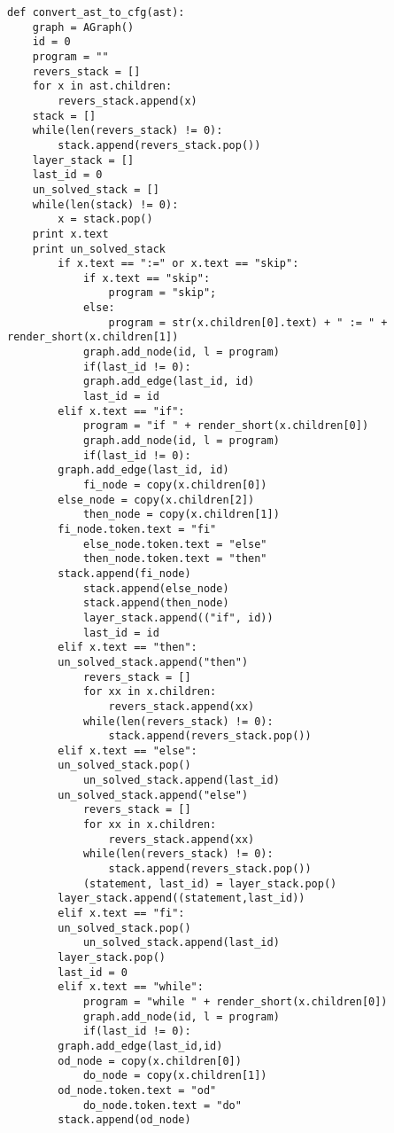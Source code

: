 \documentclass{article}
\begin{document}
{\begin{verbatim}
def convert_ast_to_cfg(ast):
    graph = AGraph()
    id = 0
    program = ""
    revers_stack = []
    for x in ast.children:
        revers_stack.append(x)
    stack = []
    while(len(revers_stack) != 0):
        stack.append(revers_stack.pop())
    layer_stack = []
    last_id = 0
    un_solved_stack = []
    while(len(stack) != 0):
        x = stack.pop()
	print x.text
	print un_solved_stack
        if x.text == ":=" or x.text == "skip":
            if x.text == "skip":
                program = "skip";
            else:
                program = str(x.children[0].text) + " := " + render_short(x.children[1])
            graph.add_node(id, l = program)
            if(last_id != 0):
	        graph.add_edge(last_id, id)
            last_id = id
        elif x.text == "if":
            program = "if " + render_short(x.children[0])
            graph.add_node(id, l = program)
            if(last_id != 0):
		graph.add_edge(last_id, id)
            fi_node = copy(x.children[0])
	    else_node = copy(x.children[2])
            then_node = copy(x.children[1])
	    fi_node.token.text = "fi"
            else_node.token.text = "else"
            then_node.token.text = "then"
	    stack.append(fi_node)
            stack.append(else_node)
            stack.append(then_node)
            layer_stack.append(("if", id))
            last_id = id
        elif x.text == "then":
	    un_solved_stack.append("then")
            revers_stack = []
            for xx in x.children:
                revers_stack.append(xx)
            while(len(revers_stack) != 0):
                stack.append(revers_stack.pop())
        elif x.text == "else":
	    un_solved_stack.pop()
            un_solved_stack.append(last_id)
	    un_solved_stack.append("else")
            revers_stack = []
            for xx in x.children:
                revers_stack.append(xx)
            while(len(revers_stack) != 0):
                stack.append(revers_stack.pop())
            (statement, last_id) = layer_stack.pop()
	    layer_stack.append((statement,last_id))
        elif x.text == "fi":
	    un_solved_stack.pop()
            un_solved_stack.append(last_id)
	    layer_stack.pop()
	    last_id = 0
        elif x.text == "while":
            program = "while " + render_short(x.children[0])
            graph.add_node(id, l = program)
            if(last_id != 0):
		graph.add_edge(last_id,id)
	    od_node = copy(x.children[0])
            do_node = copy(x.children[1])
	    od_node.token.text = "od"
            do_node.token.text = "do"
	    stack.append(od_node)

\end{verbatim}}
\end{document}
